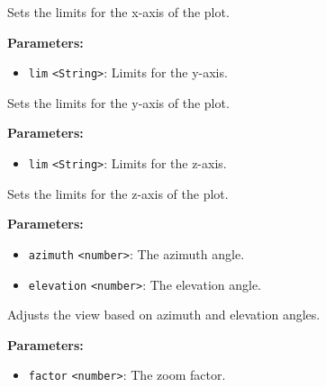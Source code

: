 \documentclass[12pt,a4paper]{article}
\begin{document}
\noindent Sets the limits for the x-axis of the plot.

\vspace{5mm}
\noindent {}


\noindent \textbf{Parameters:}
\begin{itemize}
  \item \texttt{lim} \texttt{<String>}: Limits for the y-axis.
\end{itemize}

\noindent Sets the limits for the y-axis of the plot.

\vspace{5mm}
\noindent {}


\noindent \textbf{Parameters:}
\begin{itemize}
  \item \texttt{lim} \texttt{<String>}: Limits for the z-axis.
\end{itemize}

\noindent Sets the limits for the z-axis of the plot.

\vspace{5mm}
\noindent {}


\noindent \textbf{Parameters:}
\begin{itemize}
  \item \texttt{azimuth} \texttt{<number>}: The azimuth angle.
  \item \texttt{elevation} \texttt{<number>}: The elevation angle.
\end{itemize}

\noindent Adjusts the view based on azimuth and elevation angles.

\vspace{5mm}
\noindent {}


\noindent \textbf{Parameters:}
\begin{itemize}
  \item \texttt{factor} \texttt{<number>}: The zoom factor.
\end{itemize}
\end{document}
